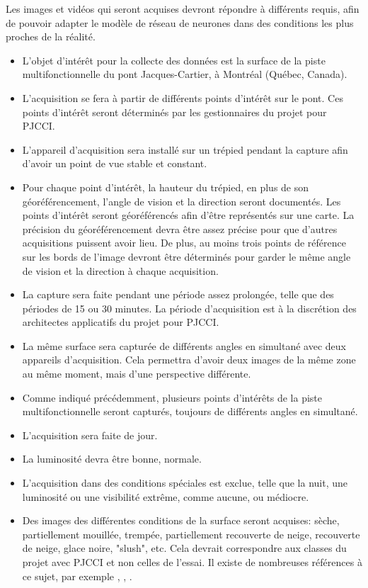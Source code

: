 \par Les images et vidéos qui seront acquises devront répondre à différents requis, afin de pouvoir adapter le modèle de réseau de neurones dans des conditions les plus proches de la réalité. 
\begin{itemize}
   \item L'objet d'intérêt pour la collecte des données est la surface de la piste multifonctionnelle du pont Jacques-Cartier, à Montréal (Québec, Canada). 
   \item L'acquisition se fera à partir de différents points d'intérêt sur le pont. Ces points d'intérêt seront déterminés par les gestionnaires du projet pour PJCCI. 
   \item L'appareil d'acquisition sera installé sur un trépied pendant la capture afin d'avoir un point de vue stable et constant. 
   \item Pour chaque point d'intérêt, la hauteur du trépied, en plus de son géoréférencement, l'angle de vision et la direction seront documentés. Les points d'intérêt seront géoréférencés afin d'être représentés sur une carte. La précision du géoréférencement devra être assez précise pour que d'autres acquisitions puissent avoir lieu. De plus, au moins trois points de référence sur les bords de l'image devront être déterminés pour garder le même angle de vision et la direction à chaque acquisition. 
   \item La capture sera faite pendant une période assez prolongée, telle que des périodes de 15 ou 30 minutes. La période d'acquisition est à la discrétion des architectes applicatifs du projet pour PJCCI.
   \item La même surface sera capturée de différents angles en simultané avec deux appareils d'acquisition. Cela permettra d'avoir deux images de la même zone au même moment, mais d'une perspective différente.
   \item Comme indiqué précédemment, plusieurs points d'intérêts de la piste multifonctionnelle seront capturés, toujours de différents angles en simultané.
   \item L'acquisition sera faite de jour.
   \item La luminosité devra être bonne, normale. 
   \item L'acquisition dans des conditions spéciales est exclue, telle que la nuit, une luminosité ou une visibilité extrême, comme aucune, ou médiocre.
   \item Des images des différentes conditions de la surface seront acquises: sèche, partiellement mouillée, trempée, partiellement recouverte de neige, recouverte de neige, glace noire, "slush", etc. Cela devrait correspondre aux classes du projet avec PJCCI et non celles de l'essai. Il existe de nombreuses références à ce sujet, par exemple \cite{cheng_road_2019}, \cite{fu_risk-based_2017}, \cite{pan_winter_nodate}.

\end{itemize}
